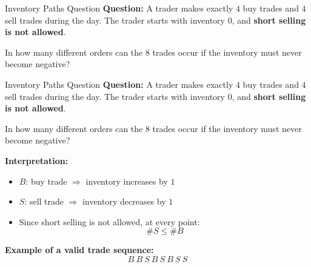 \begin{frame}{Inventory Paths Question}
  \textcolor{sqt-question}{
    \textbf{Question:}
    A trader makes exactly \(4\) buy trades and \(4\) sell trades during the day.
    The trader starts with inventory \(0\), and \textbf{short selling is not allowed}.
  }

  \vspace{0.6em}

  In how many different orders can the \(8\) trades occur if the inventory must
  never become negative?
\end{frame}

\begin{frame}{Inventory Paths Question}
  \textcolor{sqt-question}{
    \textbf{Question:}
    A trader makes exactly \(4\) buy trades and \(4\) sell trades during the day.
    The trader starts with inventory \(0\), and \textbf{short selling is not allowed}.
  }

  \vspace{0.6em}

  In how many different orders can the \(8\) trades occur if the inventory must
  never become negative?

  \vspace{0.8em}

  \textbf{Interpretation:}
  \begin{itemize}
    \item \(B\): buy trade \(\Rightarrow\) inventory increases by \(1\)
    \item \(S\): sell trade \(\Rightarrow\) inventory decreases by \(1\)
    \item Since short selling is not allowed, at every point:
    \[
      \#S \le \#B
    \]
  \end{itemize}

  \vspace{0.5em}

  \textbf{Example of a valid trade sequence:}
  \[
    B\ B\ S\ B\ S\ B\ S\ S
  \]
\end{frame}

